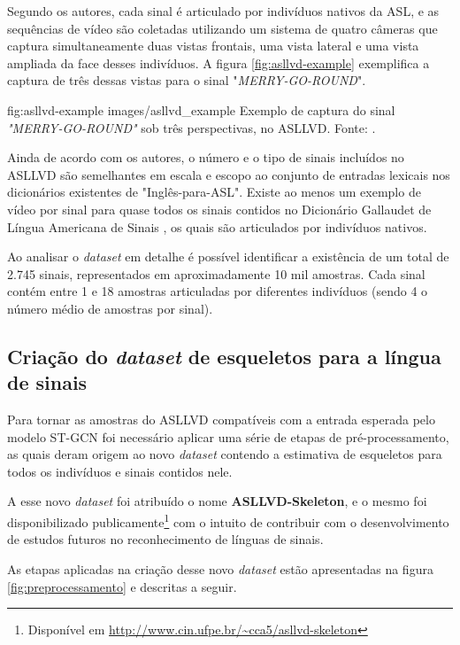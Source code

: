 Segundo os autores, cada sinal é articulado por indivíduos nativos da ASL, e as sequências de vídeo são coletadas utilizando um sistema de quatro câmeras que captura simultaneamente duas vistas frontais, uma vista lateral e uma vista ampliada da face desses indivíduos. A figura \ref{fig:asllvd-example} exemplifica a captura de três dessas vistas para o sinal "\textit{MERRY-GO-ROUND}".

\image
    {fig:asllvd-example}
    {images/asllvd_example}
    {Exemplo de captura do sinal \textit{"MERRY-GO-ROUND"} sob três perspectivas, no ASLLVD. Fonte:  \cite[p. 2]{athitsos-asllvd-2008}.}

Ainda de acordo com os autores, o número e o tipo de sinais incluídos no ASLLVD são semelhantes em escala e escopo ao conjunto de entradas lexicais nos dicionários existentes de "Inglês-para-ASL". Existe ao menos um exemplo de vídeo por sinal para quase todos os sinais contidos no Dicionário Gallaudet de Língua Americana de Sinais \cite{athitsos-asllvd-2008, gallaudet-2005}, os quais são articulados por indivíduos nativos. 

Ao analisar o \textit{dataset} em detalhe é possível identificar a existência de um total de 2.745 sinais, representados em aproximadamente 10 mil amostras. Cada sinal contém entre 1 e 18 amostras articuladas por diferentes indivíduos (sendo 4 o número médio de amostras por sinal).


\subsection{Criação do \textit{dataset} de esqueletos para a língua de sinais} %
\label{sec:criacao-dataset}

Para tornar as amostras do ASLLVD compatíveis com a entrada esperada pelo modelo ST-GCN foi necessário aplicar uma série de etapas de pré-processamento, as quais deram origem ao novo \textit{dataset} contendo a estimativa de esqueletos para todos os indivíduos e sinais contidos nele.

A esse novo \textit{dataset} foi atribuído o nome \textbf{ASLLVD-Skeleton}, e o mesmo foi disponibilizado publicamente\footnote{
    Disponível em \url{http://www.cin.ufpe.br/~cca5/asllvd-skeleton}
} com o intuito de contribuir com o desenvolvimento de estudos futuros no reconhecimento de línguas de sinais.

As etapas aplicadas na criação desse novo \textit{dataset} estão apresentadas na figura \ref{fig:preprocessamento} e descritas a seguir.

